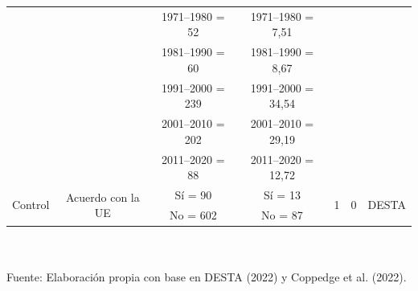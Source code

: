 \documentclass[a4paper]{tufte-handout}
\begin{document}
\begin{table}[h]
\begin{tabular}{c c c c c c c}
    & & 1971--1980 = 52 & 1971--1980 = 7,51 & & & \\
    & & 1981--1990 = 60 & 1981--1990 = 8,67 & & & \\ 
    & & 1991--2000 = 239 & 1991--2000 = 34,54 & & & \\
    & & 2001--2010 = 202 & 2001--2010 = 29,19 & & & \\ 
    & & 2011--2020 = 88 & 2011--2020 = 12,72 & & & \\ \midrule
    \multirow{2}{*}{Control} & \multirow{2}{*}{Acuerdo con la UE} & Sí = 90 & Sí = 13 & \multirow{2}{*}{1} & \multirow{2}{*}{0} & \multirow{2}{*}{DESTA} \\
    & & No = 602 & No = 87 &  &  & \\ \bottomrule
  \end{tabular}
  \\~\\ \smallskip\noindent\scriptsize Fuente: Elaboración propia con base en DESTA (2022) y Coppedge et al. (2022).
\end{table}
\end{document}
